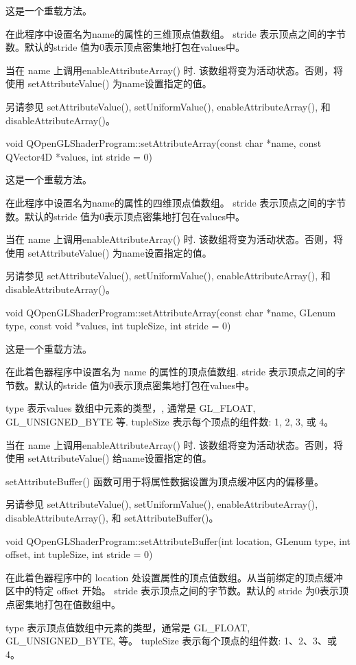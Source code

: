 这是一个重载方法。

在此程序中设置名为name的属性的三维顶点值数组。 stride 表示顶点之间的字节数。默认的stride 值为0表示顶点密集地打包在values中。

当在 name 上调用enableAttributeArray() 时. 该数组将变为活动状态。否则，将使用 setAttributeValue() 为name设置指定的值。

另请参见 setAttributeValue(), setUniformValue(), enableAttributeArray(), 和 disableAttributeArray()。

void QOpenGLShaderProgram::setAttributeArray(const char *name, const QVector4D *values, int stride = 0)

这是一个重载方法。

在此程序中设置名为name的属性的四维顶点值数组。 stride 表示顶点之间的字节数。默认的stride 值为0表示顶点密集地打包在values中。

当在 name 上调用enableAttributeArray() 时. 该数组将变为活动状态。否则，将使用 setAttributeValue() 为name设置指定的值。

另请参见 setAttributeValue(), setUniformValue(), enableAttributeArray(), 和 disableAttributeArray()。

void QOpenGLShaderProgram::setAttributeArray(const char *name, GLenum type, const void *values, int tupleSize, int stride = 0)

这是一个重载方法。

在此着色器程序中设置名为 name 的属性的顶点值数组. stride 表示顶点之间的字节数。默认的stride 值为0表示顶点密集地打包在values中。

type 表示values 数组中元素的类型，, 通常是 GL\_FLOAT, GL\_UNSIGNED\_BYTE 等. tupleSize 表示每个顶点的组件数: 1, 2, 3, 或 4。

当在 name 上调用enableAttributeArray() 时. 该数组将变为活动状态。否则，将使用 setAttributeValue() 给name设置指定的值。

setAttributeBuffer() 函数可用于将属性数据设置为顶点缓冲区内的偏移量。

另请参见 setAttributeValue(), setUniformValue(), enableAttributeArray(), disableAttributeArray(), 和 setAttributeBuffer()。

void QOpenGLShaderProgram::setAttributeBuffer(int location, GLenum type, int offset, int tupleSize, int stride = 0)

在此着色器程序中的 location 处设置属性的顶点值数组。从当前绑定的顶点缓冲区中的特定 offset 开始。 stride 表示顶点之间的字节数。默认的 stride 为0表示顶点密集地打包在值数组中。

type 表示顶点值数组中元素的类型，通常是 GL\_FLOAT, GL\_UNSIGNED\_BYTE, 等。 tupleSize 表示每个顶点的组件数: 1、2、3、或 4。

